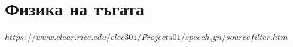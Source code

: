 \documentclass[12pt]{report}
\begin{document}
    \section{Физика на тъгата}
    $https://www.clear.rice.edu/elec301/Projects01/speech_syn/sourcefilter.htm$
    \begin{figure}[ht]%
        \centering
        \begin{changemargin}{0cm}{0cm} 
             \hspace{0.8cm}
            \subfloat[Part 2]{%
}
\end{changemargin}
\end{figure}
\end{document}
